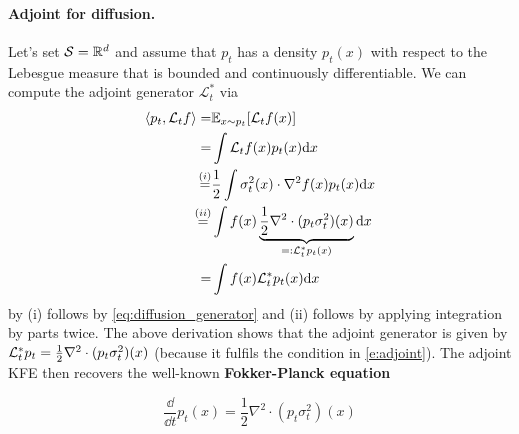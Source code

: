 \documentclass{fairmeta}
\newcommand{\highlight}[1]{{\color{metablue} \textbf{#1}}}
\numberwithin{equation}{section}
\begin{document}
\paragraph{Adjoint for diffusion. }Let's set ${\mathcal{S}}=\mathbb{R}^d$  and assume that $p_t$ has a density $p_t(x)$ with respect to the Lebesgue measure that is bounded and continuously differentiable. We can compute the adjoint generator $\mathcal{L}_t^*$ via
\begin{align}
\left \langle p_t, \mathcal{L}_t f\right \rangle
=&\mathbb{E}_{x\sim p_t}[\mathcal{L}_t f(x)]\\
=&\int \mathcal{L}_t f(x) p_t(x)\mathrm{d} x\\
\overset{(i)}{=}&\frac{1}{2}\int \sigma_t^2(x)\cdot\nabla^2f(x) p_t(x)\mathrm{d} x\\
\overset{(ii)}{=}&\int f(x)\underbrace{\frac{1}{2}\nabla^2\cdot(p_t\sigma_t^2)(x)}_{=:\mathcal{L}_t^*p_t(x)}\mathrm{d} x\\
=&\int f(x)\mathcal{L}_t^*p_t(x)\mathrm{d} x
\end{align}
by (i) follows by \cref{eq:diffusion_generator} and (ii) follows by applying integration by parts twice. The above derivation shows that the adjoint generator is given by ${\mathcal{L}}_t^*p_t=\frac{1}{2}\nabla^2\cdot(p_t\sigma_t^2)(x)$ (because it fulfils the condition in \cref{e:adjoint}). The adjoint KFE then recovers the well-known \highlight{Fokker-Planck equation}
\begin{myframe}
\begin{equation}\label{e:fokker_planck}
\frac{\dd}{\dd t} p_t(x) =\frac{1}{2}\nabla^2\cdot(p_t\sigma_t^2)(x)
\end{equation}
\end{myframe}
\end{document}
